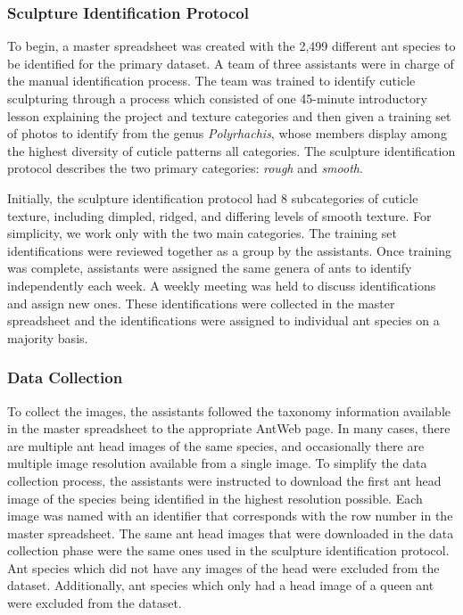 \documentclass{aci}
\numberwithin{equation}{section}
\begin{document}
\subsubsection{Sculpture Identification Protocol}

To begin, a master spreadsheet was created with the 2,499 different ant species
to be identified for the primary dataset. A team of three assistants were in
charge of the manual identification process. The team was trained to identify
cuticle sculpturing through a process which consisted of one 45-minute
introductory lesson explaining the project and texture categories and then given
a training set of photos to identify from the genus \textit{Polyrhachis}, whose
members display among the highest diversity of cuticle patterns all categories.
The sculpture identification protocol describes the two primary categories:
\textit{rough} and \textit{smooth}.

Initially, the sculpture identification protocol had 8 subcategories of cuticle
texture, including dimpled, ridged, and differing levels of smooth texture. For
simplicity, we work only with the two main categories. The training set
identifications were reviewed together as a group by the assistants. Once
training was complete, assistants were assigned the same genera of ants to
identify independently each week. A weekly meeting was held to discuss
identifications and assign new ones. These identifications were collected in the
master spreadsheet and the identifications were assigned to individual ant
species on a majority basis.

\subsubsection{Data Collection}

To collect the images, the assistants followed the taxonomy information
available in the master spreadsheet to the appropriate AntWeb page. In many
cases, there are multiple ant head images of the same species, and occasionally
there are multiple image resolution available from a single image. To simplify
the data collection process, the assistants were instructed to download the
first ant head image of the species being identified in the highest resolution
possible. Each image was named with an identifier that corresponds with the row
number in the master spreadsheet. The same ant head images that were downloaded
in the data collection phase were the same ones used in the sculpture
identification protocol. Ant species which did not have any images of the head
were excluded from the dataset. Additionally, ant species which only had a head
image of a queen ant were excluded from the dataset.
\end{document}
